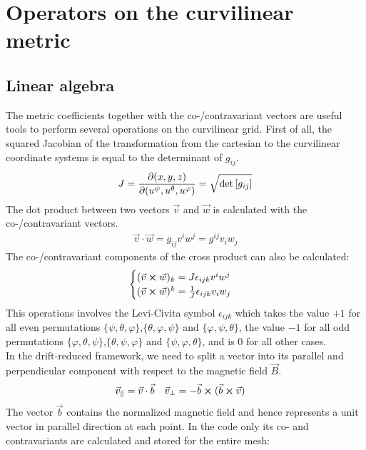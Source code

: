 \chapter{Operators on the curvilinear metric}
\label{app:CurvilinearMetric}

\section{Linear algebra}
\label{sec:app_linearAlgebra}

The metric coefficients together with the co-/contravariant vectors are useful tools to perform several operations on the curvilinear grid. First of all, the squared Jacobian of the transformation from the cartesian to the curvilinear coordinate systems is equal to the determinant of $g_{ij}$. 
\begin{align}
	J = \pdv{(x,y,z)}{(u^\psi, u^\theta, u^\varphi)} = \sqrt{\det\left[g_{ij}\right]} \label{eq:MetricJacobian}
\end{align}
The dot product between two vectors $\vec{v}$ and $\vec{w}$ is calculated with the co-/contravariant vectors.
\begin{align}
	\vec{v}\cdot\vec{w} = g_{ij}v^iw^j = g^{ij}v_iw_j \label{eq:MetricDotProduct}
\end{align}
The co-/contravariant components of the cross product can also be calculated: 
\begin{align}
	\begin{cases}
		(\vec{v} \cross \vec{w})_k = J\epsilon_{ijk}v^iw^j \\
		(\vec{v} \cross \vec{w})^k = \frac{1}{J}\epsilon_{ijk}v_iw_j
	\end{cases} \label{eq:MetricCrossProduct}
\end{align}
This operations involves the Levi-Civita symbol $\epsilon_{ijk}$ which takes the value $+1$ for all even permutations $\{\psi,\theta,\varphi\}$,$\{\theta,\varphi,\psi\}$ and $\{\varphi,\psi,\theta\}$, the value $-1$ for all odd permutations $\{\varphi,\theta,\psi\}$,$\{\theta,\psi,\varphi\}$ and $\{\psi,\varphi,\theta\}$, and is $0$ for all other cases. \\
In the drift-reduced framework, we need to split a vector into its parallel and perpendicular component with respect to the magnetic field $\vec{B}$.
\begin{align}
	\vec{v}_\parallel &= \vec{v}\cdot\vec{b} & \vec{v}_\perp &= -\vec{b}\cross (\vec{b}\cross\vec{v}) \label{eq:MetricParalPerpVecComponents}
\end{align}
The vector $\vec{b}$ contains the normalized magnetic field and hence represents a unit vector in parallel direction at each point. In the code only its co- and contravariants are calculated and stored for the entire mesh: 

